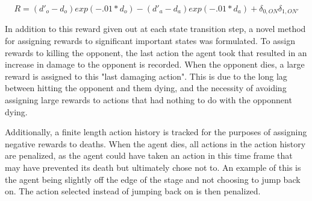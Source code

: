 $$R = (d'_o-d_o)exp(-.01*d_o) - (d'_a-d_a)exp(-.01*d_a) + \delta_{0,ON}\delta_{1,ON'}$$

In addition to this reward given out at each state transition step, a novel method for assigning rewards to significant important states was formulated. To assign rewards to killing the opponent, the last action the agent took that resulted in an increase in damage to the opponent is recorded. When the opponent dies, a large reward is assigned to this "last damaging action". This is due to the long lag between hitting the opponent and them dying, and the necessity of avoiding assigning large rewards to actions that had nothing to do with the opponnent dying. 

Additionally, a finite length action history is tracked for the purposes of assigning negative rewards to deaths. When the agent dies, all actions in the action history are penalized, as the agent could have taken an action in this time frame that may have prevented its death but ultimately chose not to. An example of this is the agent being slightly off the edge of the stage and not choosing to jump back on. The action selected instead of jumping back on is then penalized.


